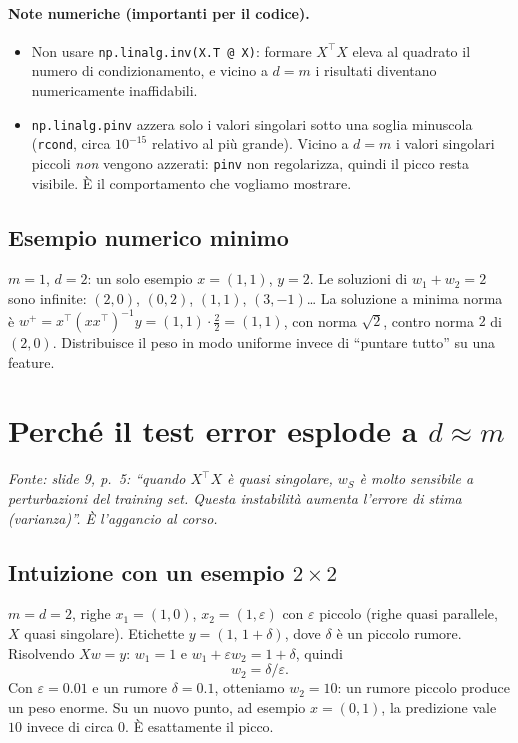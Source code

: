 \documentclass[11pt,a4paper]{article}
\newcommand{\fonte}[1]{\par\noindent\textit{Fonte: #1}\par\smallskip}
\begin{document}
\paragraph{Note numeriche (importanti per il codice).}
\begin{itemize}
  \item Non usare \texttt{np.linalg.inv(X.T @ X)}: formare $X^\top X$ eleva al quadrato il numero di condizionamento,
        e vicino a $d=m$ i risultati diventano numericamente inaffidabili.
  \item \texttt{np.linalg.pinv} azzera solo i valori singolari sotto una soglia minuscola (\texttt{rcond}, circa $10^{-15}$
        relativo al più grande). Vicino a $d=m$ i valori singolari piccoli \emph{non} vengono azzerati: \texttt{pinv}
        non regolarizza, quindi il picco resta visibile. È il comportamento che vogliamo mostrare.
\end{itemize}

\subsection{Esempio numerico minimo}
$m=1$, $d=2$: un solo esempio $x = (1,1)$, $y = 2$. Le soluzioni di $w_1 + w_2 = 2$ sono infinite: $(2,0)$, $(0,2)$,
$(1,1)$, $(3,-1)$\dots{} La soluzione a minima norma è $w^{+} = x^\top(xx^\top)^{-1}y = (1,1)\cdot\frac{2}{2} = (1,1)$,
con norma $\sqrt{2}$, contro norma $2$ di $(2,0)$. Distribuisce il peso in modo uniforme invece di
``puntare tutto'' su una feature.

\section{Perché il test error esplode a $d \approx m$}
\fonte{slide 9, p.~5: ``quando $X^\top X$ è quasi singolare, $w_S$ è molto sensibile a perturbazioni del training set.
Questa instabilità aumenta l'errore di stima (varianza)''. È l'aggancio al corso.}

\subsection{Intuizione con un esempio $2\times 2$}
$m = d = 2$, righe $x_1 = (1,0)$, $x_2 = (1,\varepsilon)$ con $\varepsilon$ piccolo (righe quasi parallele, $X$ quasi
singolare). Etichette $y = (1,\, 1+\delta)$, dove $\delta$ è un piccolo rumore.
Risolvendo $Xw = y$: $w_1 = 1$ e $w_1 + \varepsilon w_2 = 1+\delta$, quindi
\[ w_2 = \delta/\varepsilon . \]
Con $\varepsilon = 0.01$ e un rumore $\delta = 0.1$, otteniamo $w_2 = 10$: un rumore piccolo produce un peso enorme.
Su un nuovo punto, ad esempio $x = (0,1)$, la predizione vale $10$ invece di circa $0$. È esattamente il picco.
\end{document}
